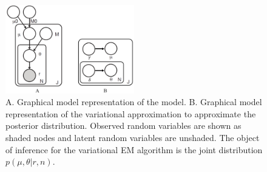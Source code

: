 \documentclass{bmcart}
\begin{document}
\begin{backmatter}
\clearpage
\begin{figure}[htpb]
\begin{center}
\includegraphics[width=0.5\textwidth]{rvd3.png}
\caption{ A. Graphical model representation of the model.
B. Graphical model representation of the variational approximation  to approximate the posterior distribution.
Observed random variables are shown as shaded nodes and latent random variables are unshaded.
The object of inference for the variational EM algorithm is the joint distribution $p(\mu, \theta|r, n)$.}
\end{center}
\end{figure}


\end{backmatter}
\end{document}
